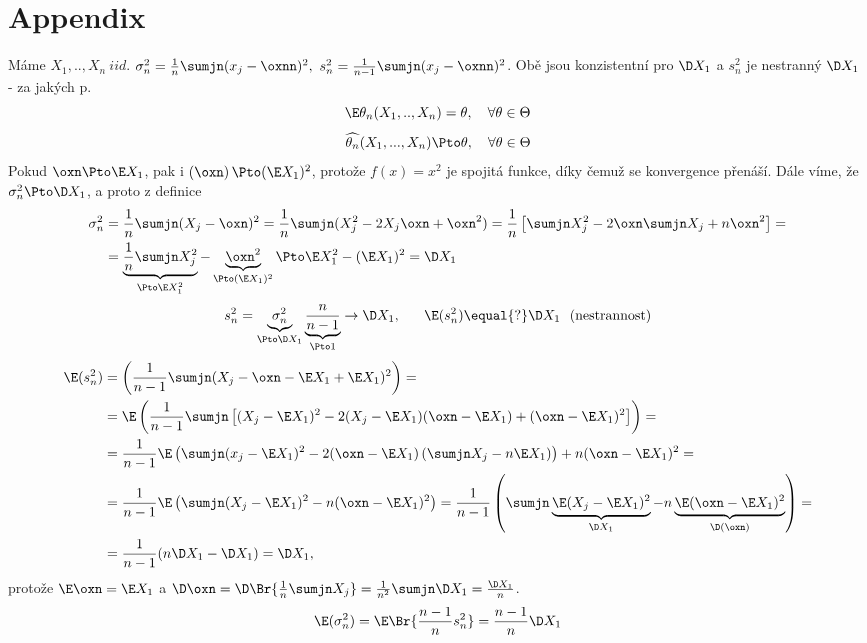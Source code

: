 
\chapter{Appendix}

\begin{example}
	Máme $X_1,..,X_n~iid$. $\sigma_n^2=\frac{1}{n}\sumjn(x_j-\oxnn)^2,~s_n^2=\frac{1}{n-1}\sumjn(x_j-\oxnn)^2$. Obě jsou konzistentní pro $\D X_1$ a $s_n^2$ je nestranný $\D X_1$ - za jakých p.
	$$ \E\theta_n(X_1,..,X_n)=\theta,~~~\forall\theta\in\Theta $$
	$$ \widehat{\theta_n}(X_1,...,X_n)\Pto \theta,~~~\forall\theta\in\Theta $$
	Pokud $\oxn\Pto\E X_1$, pak i $\left( \oxn \right)\Pto (\E X_1)^2$, protože $f(x)=x^2$ je spojitá funkce, díky čemuž se konvergence přenáší. Dále víme, že $\sigma_n^2\Pto \D X_1$, a proto z definice \[
	\begin{split}
	\sigma_n^2&=\frac{1}{n}\sumjn(X_j-\oxn)^2=\frac{1}{n}\sumjn(X_j^2-2X_j\oxn+\oxn^2)=\frac{1}{n}\left[ \sumjn X_j^2 - 2\oxn\sumjn X_j+n\oxn^2 \right]=\\&=
	\underbrace{\frac{1}{n}\sumjn X_j^2}_{\Pto\E X_1^2}-\underbrace{\oxn^2}_{\Pto (\E X_1)^2}\Pto \E X_1^2-(\E X_1)^2=\D X_1
	\end{split}
	\]
	$$ s_n^2=\underbrace{\sigma_n^2}_{\Pto \D X_1}\underbrace{\frac{n}{n-1}}_{\Pto1}\to \D X_1,~~~~~\E(s_n^2)\equal{?}\D X_1 ~~\text{(nestrannost)}$$
	\[
	\begin{split}
	 \E(s_n^2)&=\left( \frac{1}{n-1}\sumjn(X_j-\oxn-\E X_1+\E X_1)^2 \right)=\\&=\E\left( \frac{1}{n-1}\sumjn\left[ (X_j-\E X_1)^2-2(X_j-\E X_1)(\oxn-\E X_1)+(\oxn-\E X_1)^2 \right] \right)=\\&= \frac{1}{n-1}\E\left( \sumjn(x_j-\E X_1)^2-2(\oxn-\E X_1)\left( \sumjn X_j-n\E X_1 \right)\right)+n(\oxn -\E X_1)^2 =\\&= \frac{1}{n-1}\E\left( \sumjn(X_j-\E X_1)^2-n(\oxn-\E X_1)^2 \right)=\frac{1}{n-1}\left(\sumjn\underbrace{\E(X_j-\E X_1)^2}_{\D X_1}-n\underbrace{\E(\oxn-\E X_1)^2}_{\D(\oxn)} \right)=\\&=\frac{1}{n-1}(n\D X_1-\D X_1)=\D X_1 ,
	\end{split}
	\] protože $\E\oxn=\E X_1$ a $\D \oxn=\D\Br{ \frac{1}{n}\sumjn X_j} =\frac{1}{n^2}\sumjn \D X_1=\frac{\D X_1}{n}$.
	$$ \E(\sigma_n^2)=\E\Br{\frac{n-1}{n}s_n^2}=\frac{n-1}{n}\D X_1 $$
\end{example}
